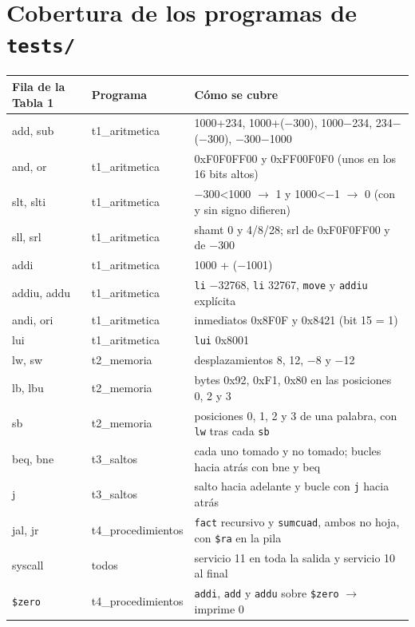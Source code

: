 \documentclass[10pt,a4paper]{article}
\newcommand{\s}[1]{\texttt{#1}}
\begin{document}
\section{Cobertura de los programas de \texttt{tests/}}

\begin{center}\small
\begin{tabularx}{\linewidth}{@{}p{3.6cm}p{3.2cm}X@{}}
\toprule
Fila de la Tabla 1 & Programa & Cómo se cubre \\
\midrule
add, sub & t1\_aritmetica & 1000+234, 1000+($-$300), 1000$-$234, 234$-$($-$300), $-$300$-$1000 \\
and, or & t1\_aritmetica & 0xF0F0FF00 y 0xFF00F0F0 (unos en los 16 bits altos) \\
slt, slti & t1\_aritmetica & $-$300<1000 $\to$ 1 y 1000<$-$1 $\to$ 0 (con y sin signo difieren) \\
sll, srl & t1\_aritmetica & shamt 0 y 4/8/28; srl de 0xF0F0FF00 y de $-$300 \\
addi & t1\_aritmetica & 1000 + ($-$1001) \\
addiu, addu & t1\_aritmetica & \s{li} $-$32768, \s{li} 32767, \s{move} y \s{addiu} explícita \\
andi, ori & t1\_aritmetica & inmediatos 0x8F0F y 0x8421 (bit 15 = 1) \\
lui & t1\_aritmetica & \s{lui} 0x8001 \\
lw, sw & t2\_memoria & desplazamientos 8, 12, $-$8 y $-$12 \\
lb, lbu & t2\_memoria & bytes 0x92, 0xF1, 0x80 en las posiciones 0, 2 y 3 \\
sb & t2\_memoria & posiciones 0, 1, 2 y 3 de una palabra, con \s{lw} tras cada \s{sb} \\
beq, bne & t3\_saltos & cada uno tomado y no tomado; bucles hacia atrás con bne y beq \\
j & t3\_saltos & salto hacia adelante y bucle con \s{j} hacia atrás \\
jal, jr & t4\_procedimientos & \s{fact} recursivo y \s{sumcuad}, ambos no hoja, con \s{\$ra} en la pila \\
syscall & todos & servicio 11 en toda la salida y servicio 10 al final \\
\s{\$zero} & t4\_procedimientos & \s{addi}, \s{add} y \s{addu} sobre \s{\$zero} $\to$ imprime 0 \\
\bottomrule
\end{tabularx}
\end{center}
\end{document}
